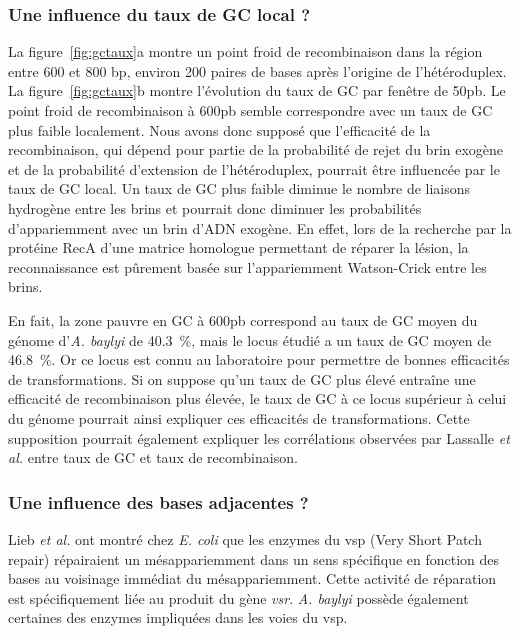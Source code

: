 \subsubsection{Une influence du taux de GC local ?}

\afterpage{\blankpage}

La figure~\ref{fig:gctaux}a montre un point froid de recombinaison dans la
région entre \num{600} et \num{800} bp, environ \num{200} paires de bases après
l'origine de l'hétéroduplex. La figure~\ref{fig:gctaux}b montre l'évolution du
taux de GC par fenêtre de \num{50}pb. Le point froid de recombinaison à
\num{600}pb semble correspondre avec un taux de GC plus faible localement. Nous
avons donc supposé que l'efficacité de la recombinaison, qui dépend pour partie
de la probabilité de rejet du brin exogène et de la probabilité d'extension de
l'hétéroduplex, pourrait être influencée par le taux de GC local. Un taux de GC
plus faible diminue le nombre de liaisons hydrogène entre les brins et pourrait
donc diminuer les probabilités d'appariemment avec un brin d'ADN exogène. En
effet, lors de la recherche par la protéine RecA d'une matrice homologue
permettant de réparer la lésion, la reconnaissance est pûrement basée sur
l'appariemment Watson-Crick entre les brins\cite{lee_base_2015}.

En fait, la zone pauvre en GC à \num{600}pb correspond au taux de GC moyen du
génome d'\emph{A. baylyi} de \SI{40.3}{\percent}, mais le locus étudié a un taux
de GC moyen de \SI{46.8}{\percent}. Or ce locus est connu au laboratoire pour
permettre de bonnes efficacités de transformations. Si on suppose qu'un taux de
GC plus élevé entraîne une efficacité de recombinaison plus élevée, le taux de
GC à ce locus supérieur à celui du génome pourrait ainsi expliquer ces
efficacités de transformations. Cette supposition pourrait également expliquer
les corrélations observées par Lassalle \emph{et
  al.}\cite{lassalle_gc-content_2015} entre taux de GC et taux de recombinaison.

\subsubsection{Une influence des bases adjacentes ?}

Lieb \emph{et al.}\cite{lieb_recombination_1985} ont montré chez \emph{E. coli}
que les enzymes du \ac{vsp} (Very Short Patch repair) répairaient un
mésappariemment dans un sens spécifique en fonction des bases au voisinage
immédiat du mésappariemment. Cette activité de réparation est spécifiquement
liée au produit du gène \emph{vsr}\cite{hennecke_vsr_1991,lieb_specific_1983}.
\emph{A. baylyi} possède également certaines des enzymes impliquées dans les
voies du \ac{vsp}\cite{kanehisa_kegg_2016}.

